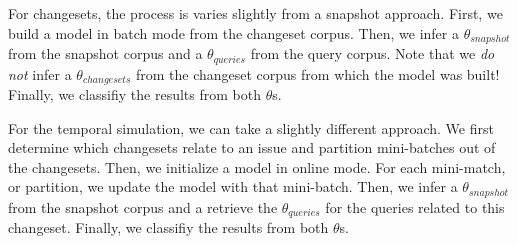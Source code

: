 For changesets, the process is varies slightly from a snapshot approach.
First, we build a model in batch mode from the changeset corpus.
Then, we infer a $\theta_{snapshot}$ from the snapshot corpus
and a $\theta_{queries}$ from the query corpus.
Note that we \emph{do not} infer a $\theta_{changesets}$ from the changeset corpus from which the model was built!
Finally, we classifiy the results from both $\theta$s.

\begin{comment}
\begin{enumerate}
    \item Build model from the changeset corpus in batch mode
    \item \emph{Do not} infer a $\theta_{changesets}$
    \item Infer a $\theta_{snapshot}$ from the snapshot corpus
    \item Infer a  $\theta_{queries}$ from the query corpus
    \item Classifiy, or rank, the results from both $\theta$s
\end{enumerate}
\end{comment}


For the temporal simulation, we can take a slightly different approach.
We first determine which changesets relate to an issue and partition mini-batches out of the changesets.
Then, we initialize a model in online mode.
For each mini-match, or partition, we update the model with that mini-batch.
Then, we infer a $\theta_{snapshot}$ from the snapshot corpus
and a retrieve the $\theta_{queries}$ for the queries related to this changeset.
Finally, we classifiy the results from both $\theta$s.

\begin{comment}
\begin{enumerate}
    \item Initialize a model in online mode
    \item Determine which changesets relate to an issue and partition mini-batches out of the changesets
    \item For each mini-batch:
        \begin{enumerate}
            \item Update the model with mini-batch
            \item Update $\theta_{snapshot}$ with the new inference of the source code document affected by this changeset
            \item Infer a $\theta_{query}$ of the query related to the changeset we stopped at
            \item Classifiy, or rank, the results from both $\theta$s
        \end{enumerate}
\end{enumerate}
\end{comment}



